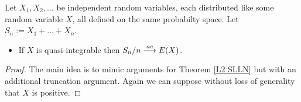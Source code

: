 \clearpage

\begin{theorem}
Let $X_1, X_2,\ldots$ be independent random variables, each distributed like some random variable $X$, all defined on the same probabilty space. Let $S_n:= X_1+\ldots+ X_n$.
\begin{itemize}
\item If $X$ is quasi-integrable then $S_n/n \overset{\small ae} \longrightarrow E(X)$.
\end{itemize}
\end{theorem}

\begin{proof}
The main idea is to mimic arguments for Theorem \ref{L2 SLLN} but with an additional truncation argument. Again we can suppose without loss of generality  that $X$ is positive.


\end{proof}

